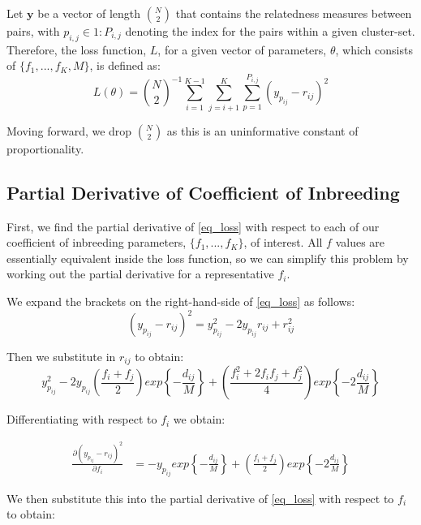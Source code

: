 \documentclass[a4paper, 12pt]{article}
\begin{document}
Let $\mathbf{y}$ be a vector of length ${N\choose2}$ that contains the relatedness measures between pairs, with $p_{i,j} \in 1:P_{i,j}$ denoting the index for the pairs within a given cluster-set. Therefore, the loss function, $L$, for a given vector of parameters, $\theta$, which consists of $\{f_1, ..., f_K, M\}$, is defined as:
%
\begin{equation}
    \label{eq_loss}
    L(\theta) = {N\choose2}^{-1} \sum_{i=1}^{K-1} \sum_{j=i+1}^K \sum_{p=1}^{P_{i,j}} (y_{p_{ij}} - r_{ij})^2
\end{equation}
%

Moving forward, we drop ${N \choose 2}$ as this is an uninformative constant of proportionality.


\subsection{Partial Derivative of Coefficient of Inbreeding}
First, we find the partial derivative of \eqref{eq_loss} with respect to each of our coefficient of inbreeding parameters, $\{f_1, ..., f_K\}$, of interest. All $f$ values are essentially equivalent inside the loss function, so we can simplify this problem by working out the partial derivative for a representative $f_i$.

\noindent We expand the brackets on the right-hand-side of \eqref{eq_loss} as follows:
\begin{equation}
    \label{eq_RHS}
    (y_{p_{ij}} - r_{ij})^2 = y_{p_{ij}}^2 - 2y_{p_{ij}}r_{ij} + r_{ij}^2
\end{equation}


\noindent Then we substitute in $r_{ij}$ to obtain:
\small
\begin{equation}
    \label{eq_RHS_ex}
 y_{p_{ij}}^2 - 2y_{p_{ij}} \left(\frac{f_i + f_j}{2}\right) exp\left\{ -\frac{d_{ij}}{M} \right\} + \left(\frac{f_i^2 + 2f_if_j + f_j^2}{4}\right) exp\left\{ -2 \frac{d_{ij}}{M} \right\}
\end{equation}
\normalsize


Differentiating with respect to $f_i$ we obtain:

\begin{align}
    \label{eq_partial_f}
    \frac{\partial(y_{p_{ij}} - r_{ij})^2}{\partial f_i} &= - y_{p_{ij}} exp\left\{ -\frac{d_{ij}}{M} \right\} + \left(\frac{f_i + f_j}{2}\right) exp\left\{ -2\frac{d_{ij}}{M} \right\}
\end{align}

We then substitute this into the partial derivative of \eqref{eq_loss} with respect to $f_i$ to obtain:
\end{document}
